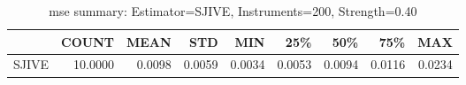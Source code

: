 \begin{table}[ht]
\centering
\caption{mse summary: Estimator=SJIVE, Instruments=200, Strength=0.40}
\begin{tabular}{lrrrrrrrr}
\toprule
 & COUNT & MEAN & STD & MIN & 25\% & 50\% & 75\% & MAX \\
\midrule
SJIVE & 10.0000 & 0.0098 & 0.0059 & 0.0034 & 0.0053 & 0.0094 & 0.0116 & 0.0234 \\
\bottomrule
\end{tabular}
\end{table}
